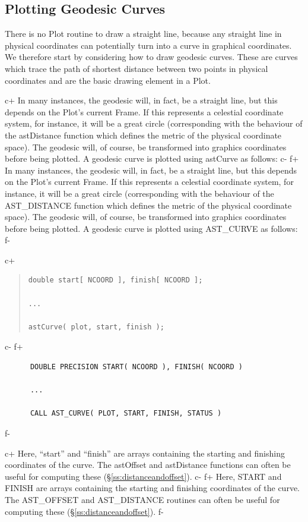 \documentclass[twoside,11pt]{article}
\newcommand{\secref}[1]{\S\ref{#1}}
\newcommand{\secref}[1]{\ref{#1}}
\begin{document}
\subsection{\label{ss:plottinggeodesics}Plotting Geodesic Curves}

There is no Plot routine to draw a straight line, because any straight
line in physical coordinates can potentially turn into a curve in
graphical coordinates. We therefore start by considering how to draw
geodesic curves.  These are curves which trace the path of shortest
distance between two points in physical coordinates
 and are the basic drawing element in a Plot.

c+
In many instances, the geodesic will, in fact, be a straight line, but
this depends on the Plot's current Frame. If this represents a
celestial coordinate system, for instance, it will be a great circle
(corresponding with the behaviour of the astDistance function which
defines the metric of the physical coordinate space).  The geodesic
will, of course, be transformed into graphics coordinates before being
plotted. A geodesic curve is plotted using astCurve as follows:
c-
f+
In many instances, the geodesic will, in fact, be a straight line, but
this depends on the Plot's current Frame. If this represents a
celestial coordinate system, for instance, it will be a great circle
(corresponding with the behaviour of the AST\_DISTANCE function which
defines the metric of the physical coordinate space).  The geodesic
will, of course, be transformed into graphics coordinates before being
plotted. A geodesic curve is plotted using AST\_CURVE as follows:
f-

c+
\begin{quote}
\small
\begin{verbatim}
double start[ NCOORD ], finish[ NCOORD ];

...

astCurve( plot, start, finish );
\end{verbatim}
\normalsize
\end{quote}
c-
f+
\small
\begin{verbatim}
      DOUBLE PRECISION START( NCOORD ), FINISH( NCOORD )

      ...

      CALL AST_CURVE( PLOT, START, FINISH, STATUS )
\end{verbatim}
\normalsize
f-

c+
Here, ``start'' and ``finish'' are arrays containing the starting and
finishing coordinates of the curve. The astOffset and astDistance
functions can often be useful for computing these
(\secref{ss:distanceandoffset}).
c-
f+
Here, START and FINISH are arrays containing the starting and
finishing coordinates of the curve. The AST\_OFFSET and AST\_DISTANCE
routines can often be useful for computing these
(\secref{ss:distanceandoffset}).
f-
\end{document}
